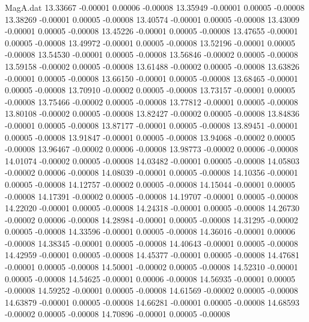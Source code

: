 \begin{filecontents}{MagA.dat}
  13.33667   -0.00001    0.00006   -0.00008
  13.35949   -0.00001    0.00005   -0.00008
  13.38269   -0.00001    0.00005   -0.00008
  13.40574   -0.00001    0.00005   -0.00008
  13.43009   -0.00001    0.00005   -0.00008
  13.45226   -0.00001    0.00005   -0.00008
  13.47655   -0.00001    0.00005   -0.00008
  13.49972   -0.00001    0.00005   -0.00008
  13.52196   -0.00001    0.00005   -0.00008
  13.54530   -0.00001    0.00005   -0.00008
  13.56846   -0.00002    0.00005   -0.00008
  13.59158   -0.00002    0.00005   -0.00008
  13.61488   -0.00002    0.00005   -0.00008
  13.63826   -0.00001    0.00005   -0.00008
  13.66150   -0.00001    0.00005   -0.00008
  13.68465   -0.00001    0.00005   -0.00008
  13.70910   -0.00002    0.00005   -0.00008
  13.73157   -0.00001    0.00005   -0.00008
  13.75466   -0.00002    0.00005   -0.00008
  13.77812   -0.00001    0.00005   -0.00008
  13.80108   -0.00002    0.00005   -0.00008
  13.82427   -0.00002    0.00005   -0.00008
  13.84836   -0.00001    0.00005   -0.00008
  13.87177   -0.00001    0.00005   -0.00008
  13.89451   -0.00001    0.00005   -0.00008
  13.91847   -0.00001    0.00005   -0.00008
  13.94068   -0.00002    0.00005   -0.00008
  13.96467   -0.00002    0.00006   -0.00008
  13.98773   -0.00002    0.00006   -0.00008
  14.01074   -0.00002    0.00005   -0.00008
  14.03482   -0.00001    0.00005   -0.00008
  14.05803   -0.00002    0.00006   -0.00008
  14.08039   -0.00001    0.00005   -0.00008
  14.10356   -0.00001    0.00005   -0.00008
  14.12757   -0.00002    0.00005   -0.00008
  14.15044   -0.00001    0.00005   -0.00008
  14.17391   -0.00002    0.00005   -0.00008
  14.19707   -0.00001    0.00005   -0.00008
  14.22020   -0.00001    0.00005   -0.00008
  14.24318   -0.00001    0.00005   -0.00008
  14.26730   -0.00002    0.00006   -0.00008
  14.28984   -0.00001    0.00005   -0.00008
  14.31295   -0.00002    0.00005   -0.00008
  14.33596   -0.00001    0.00005   -0.00008
  14.36016   -0.00001    0.00006   -0.00008
  14.38345   -0.00001    0.00005   -0.00008
  14.40643   -0.00001    0.00005   -0.00008
  14.42959   -0.00001    0.00005   -0.00008
  14.45377   -0.00001    0.00005   -0.00008
  14.47681   -0.00001    0.00005   -0.00008
  14.50001   -0.00002    0.00005   -0.00008
  14.52310   -0.00001    0.00005   -0.00008
  14.54625   -0.00001    0.00006   -0.00008
  14.56935   -0.00001    0.00005   -0.00008
  14.59252   -0.00001    0.00005   -0.00008
  14.61569   -0.00002    0.00005   -0.00008
  14.63879   -0.00001    0.00005   -0.00008
  14.66281   -0.00001    0.00005   -0.00008
  14.68593   -0.00002    0.00005   -0.00008
  14.70896   -0.00001    0.00005   -0.00008

\end{filecontents}
